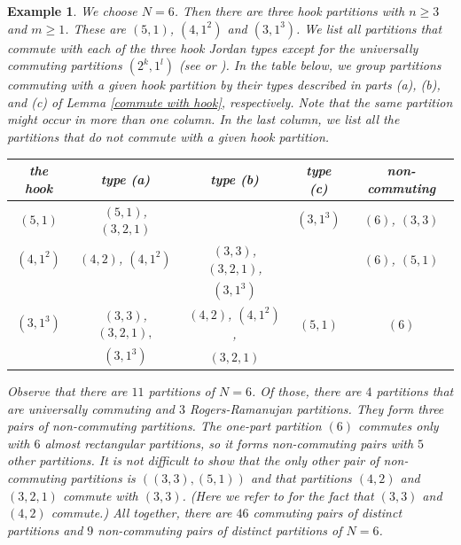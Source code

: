 \documentclass[11pt]{amsproc}
\newtheorem{exmp}[thm]{Example}
\begin{document}
 
\begin{exmp} We choose $N=6$. Then there are three hook partitions with $n\ge 3$ and $m\ge 1$. These are $(5,1)$, $(4,1^2)$ and $(3,1^3)$. We list all partitions that commute with each of the three hook Jordan types except for the universally commuting partitions $(2^k,1^l)$ (see \cite[Thm. 2.4]{Obl-3} or \cite[Thm. 4.11]{BW}). In the table below, we group partitions commuting with a given hook partition  by their types described in parts (a), (b), and (c) of Lemma \ref{commute with hook}, respectively. Note that the same partition might occur in more than one column. In the last column, we list all the partitions that do not commute with a given hook partition.
\begin{center}
\begin{tabular}{|c||c|c|c|c|}
\hline
the hook  & type (a)   & type (b)   & type (c) & non-commuting \\
\hline \hline
$(5,1)$& $(5,1)$, $(3,2,1)$  &  &  $(3,1^3)$ & $(6)$, $(3,3)$ \\
\hline
$(4,1^2)$ & $(4,2)$, $(4,1^2)$  & $(3,3)$, $(3,2,1)$, &  & $(6)$, $(5,1)$ \\
& & $(3,1^3)$ & & \\
\hline
$(3,1^3)$ & $(3,3)$, $(3,2,1),$  &  $(4,2)$, $(4,1^2)$, & $(5,1)$ & $(6)$ \\
& $(3,1^3)$  & $(3,2,1)$ & & \\
\hline \hline
\end{tabular}
\end{center}

Observe that there are $11$ partitions of $N=6$. Of those, there are $4$ partitions that are universally commuting and $3$ Rogers-Ramanujan partitions. They form three pairs of non-commuting partitions. The one-part partition $(6)$ commutes only with $6$ almost rectangular partitions, so it forms non-commuting pairs with $5$ other partitions. It is not difficult to show that the only other pair of non-commuting partitions is $((3,3),(5,1))$ and that partitions $(4,2)$ and $(3,2,1)$ commute with $(3,3)$. (Here we refer to \cite[Thm. 3.1]{Obl-3} for the fact that $(3,3)$ and $(4,2)$ commute.) All together, there are $46$ commuting pairs of distinct partitions and $9$ non-commuting pairs of distinct partitions of $N=6$.


\end{exmp}
\end{document}
